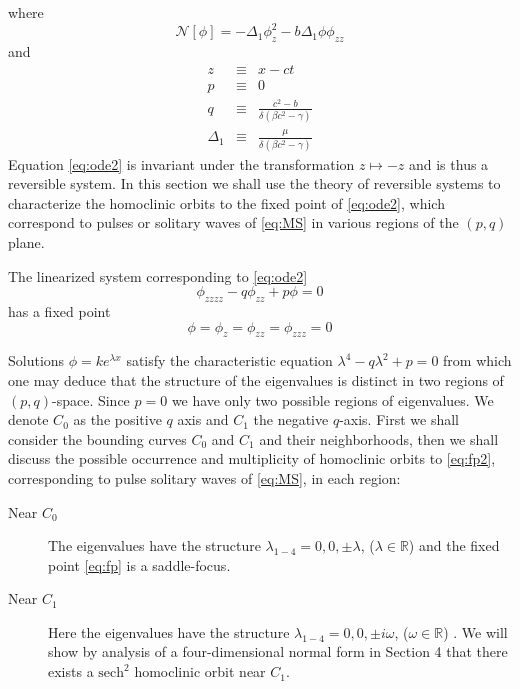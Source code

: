 where 
\begin{equation}
\mathcal{N}\left[\phi\right] = -\Delta_1 \phi_z^2 - b \Delta_1 \phi \phi_{zz}
\end{equation}
and
\begin{subequations}
\begin{eqnarray}
z &\equiv& x - c t\\
p &\equiv& 0\label{eq:pdef} \\
q &\equiv & \frac{c^2 - b}{\delta\left(\beta c^2 - \gamma\right)} 
\label{eq:qdef2} \\
\Delta_1 &\equiv& \frac{\mu}{ \delta\left( \beta c^2 - \gamma\right) }\label{eq:deltadef} 
\end{eqnarray}
\end{subequations}
Equation \eqref{eq:ode2} is invariant under the transformation $ z \mapsto -z $ and is thus a reversible system. In this section we shall
use the theory of reversible systems to characterize the homoclinic orbits to the fixed point of \eqref{eq:ode2}, which correspond to pulses
or solitary waves of \eqref{eq:MS} in various regions of the $(p,q)$ plane.

The linearized system corresponding to \eqref{eq:ode2}
\begin{equation}
 \label{eq:linode2} \phi_{zzzz} - q \phi_{zz} + p \phi = 0
\end{equation}
has a fixed point \begin{equation}\label{eq:fp2} \phi = \phi_z = \phi_{zz} = \phi_{zzz} = 0 \end{equation}

Solutions $\phi = k e^{\lambda x}$ satisfy the characteristic equation
$\lambda^4 - q \lambda^2 + p = 0 $ from which one may deduce that the structure
of the eigenvalues is distinct in two regions of $\left(p,q\right)$-space.
Since $p=0$ we have only two possible regions of eigenvalues.  We denote $C_0$
as the positive $q$ axis and $C_1$ the negative $q$-axis. First we shall 
consider the bounding curves $C_0$ and $C_1$ and their neighborhoods, then we shall discuss the possible
occurrence and multiplicity of homoclinic orbits to \eqref{eq:fp2}, corresponding
to pulse solitary waves of \eqref{eq:MS}, in each region:

\begin{description}
\item[Near $C_0$] 
The eigenvalues have the structure $\lambda_{1-4} = 0,0,\pm \lambda$, ($\lambda \in \mathbb{R}$) and the fixed point
\eqref{eq:fp} is a saddle-focus.
\item[Near $C_1$] 
Here the eigenvalues have the structure $\lambda_{1-4} = 0,0,\pm i \omega $, ($\omega \in \mathbb{R}$) . We will show by analysis of a
four-dimensional normal form in Section 4 that there exists a $\mathrm{sech}^2$ homoclinic orbit near $C_1$.
\end{description}

